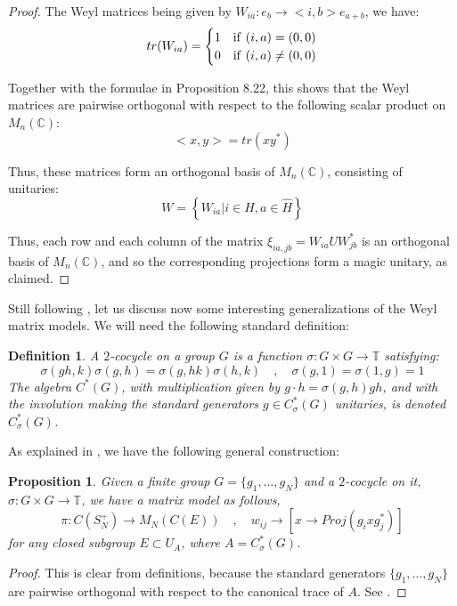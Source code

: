 \documentclass[12pt]{amsbook}
\newtheorem{definition}[theorem]{Definition}
\newtheorem{proposition}[theorem]{Proposition}
\begin{document}
\begin{proof}
The Weyl matrices being given by $W_{ia}:e_b\to<i,b>e_{a+b}$, we have:
$$tr(W_{ia})=\begin{cases}
1&{\rm if}\ (i,a)=(0,0)\\
0&{\rm if}\ (i,a)\neq(0,0)
\end{cases}$$

Together with the formulae in Proposition 8.22, this shows that the Weyl matrices are pairwise orthogonal with respect to the following scalar product on $M_n(\mathbb C)$:
$$<x,y>=tr(xy^*)$$

Thus, these matrices form an orthogonal basis of $M_n(\mathbb C)$, consisting of unitaries:
$$W=\left\{W_{ia}\Big|i\in H,a\in\widehat{H}\right\}$$

Thus, each row and each column of the matrix $\xi_{ia,jb}=W_{ia}UW_{jb}^*$ is an orthogonal basis of $M_n(\mathbb C)$, and so the corresponding projections form a magic unitary, as claimed.
\end{proof}

Still following \cite{bne}, let us discuss now some interesting generalizations of the Weyl matrix models. We will need the following standard definition:

\begin{definition}
A $2$-cocycle on a group $G$ is a function $\sigma:G\times G\to\mathbb T$ satisfying:
$$\sigma(gh,k)\sigma(g,h)=\sigma(g,hk)\sigma(h,k)\quad,\quad 
\sigma(g,1)=\sigma(1,g)=1$$
The algebra $C^*(G)$, with multiplication given by $g\cdot h=\sigma(g,h)gh$, and with the involution making the standard generators $g\in C^*_\sigma(G)$ unitaries, is denoted $C^*_\sigma(G)$.
\end{definition}

As explained in \cite{bne}, we have the following general construction:

\begin{proposition}
Given a finite group $G=\{g_1,\ldots,g_N\}$ and a $2$-cocycle on it, $\sigma:G\times G\to\mathbb T$, we have a matrix model as follows, 
$$\pi:C(S_N^+)\to M_N(C(E))\quad,\quad 
w_{ij}\to[x\to Proj(g_ixg_j^*)]$$
for any closed subgroup $E\subset U_A$, where $A=C^*_\sigma(G)$. 
\end{proposition}

\begin{proof}
This is clear from definitions, because the standard generators $\{g_1,\ldots,g_N\}$ are pairwise orthogonal with respect to the canonical trace of $A$. See \cite{bne}.
\end{proof}
\end{document}
